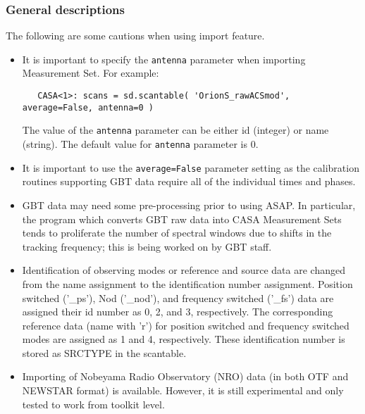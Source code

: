 \subsubsection{General descriptions}
\label{subsubsection:sd.asap.import.gen}

The following are some cautions when using import feature.

\begin{itemize}

\item It is important to specify the {\tt antenna} parameter when importing Measurement Set.
 For example:

\begin{verbatim}
   CASA<1>: scans = sd.scantable( 'OrionS_rawACSmod', average=False, antenna=0 )
\end{verbatim}
 
 The value of the {\tt antenna} parameter can be either id (integer) or name
 (string). The default value for {\tt antenna} parameter is 0.

\item It is important to use the {\tt average=False} parameter
setting as the calibration routines supporting GBT data require all of
the individual times and phases.

\item GBT data may need some pre-processing prior to using
ASAP. In particular, the program which converts GBT raw data into CASA
Measurement Sets tends to proliferate the number of spectral windows
due to shifts in the tracking frequency; this is being worked on by
GBT staff. 

%
\item  Identification of observing modes or reference and source data are
 changed from the name assignment to the identification number
 assignment. Position switched ('\_ps'), Nod ('\_nod'), and  frequency
 switched ('\_fs') data are assigned their id number as 0, 2, and 3,
 respectively. The corresponding reference data (name with 'r') for position
 switched and frequency switched modes are assigned as 1 and 4,
 respectively. These identification number is stored as SRCTYPE in
 the scantable.

\item  Importing of Nobeyama Radio Observatory (NRO) data (in both OTF and NEWSTAR format)
 is available. However, it is still experimental and only tested to work from toolkit level.
\end{itemize}

